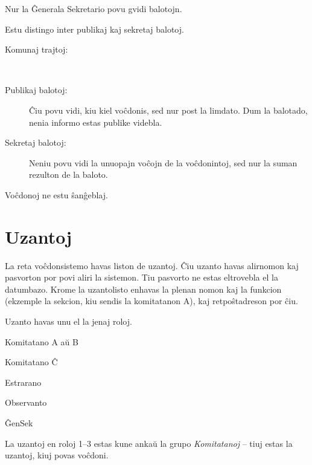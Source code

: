 \documentclass[draft]{scrartcl}
\newenvironment{enumerate*}{%
  \begin{enumerate}%
  \setlength{\itemsep}{0pt}%
  \setlength{\parsep}{0pt}%
  \setlength{\parskip}{2pt plus 1pt}
  \setlength{\topsep}{1pt}%
  \setlength{\partopsep}{0pt}%
}{%
    \end{enumerate}%
}
\begin{document}
\begin{enumerate*}
\item Nur la Ĝenerala Sekretario povu gvidi balotojn.
\item Estu distingo inter publikaj kaj sekretaj balotoj.
  \begin{description}
  \item[Komunaj trajtoj:] ~
  \item [Publikaj balotoj:]
    Ĉiu povu vidi, kiu kiel voĉdonis, sed nur post la limdato. Dum la
    balotado, nenia informo estas publike videbla.

  \item [Sekretaj balotoj:]
    Neniu povu vidi la unuopajn voĉojn de la voĉdonintoj, sed nur la
    suman rezulton de la baloto.
  \end{description}
\item Voĉdonoj ne estu ŝanĝeblaj.
\end{enumerate*}

\section{Uzantoj}
La reta voĉdonsistemo havas liston de uzantoj.
Ĉiu uzanto havas alirnomon kaj pasvorton por povi aliri la sistemon.
Tiu pasvorto ne estas eltrovebla el la datumbazo.
Krome la uzantolisto enhavas la plenan nomon kaj la funkcion
(ekzemple la sekcion, kiu sendis la komitatanon A), kaj retpoŝtadreson
por ĉiu.

Uzanto havas unu el la jenaj roloj.
\begin{enumerate*}
\item Komitatano A aŭ B
\item Komitatano Ĉ
\item Estrarano
\item Observanto
\item ĜenSek
\end{enumerate*}
La uzantoj en roloj 1--3 estas kune ankaŭ la grupo \emph{Komitatanoj} -- tiuj
estas la uzantoj, kiuj povas voĉdoni.
\end{document}
